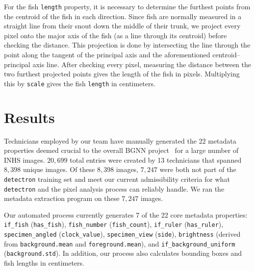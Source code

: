 \documentclass[screen,review]{acmart}
\begin{document}
For the fish \verb|length| property, it is necessary to determine the furthest points from the centroid of the fish in each direction. Since fish are normally measured in a straight line from their snout down the middle of their trunk, we project every pixel onto the major axis of the fish (as a line through its centroid) before checking the distance. This projection is done by intersecting the line through the point along the tangent of the principal axis and the aforementioned centroid--principal axis line. After checking every pixel, measuring the distance between the two furthest projected points gives the length of the fish in pixels. Multiplying this by \verb|scale| gives the fish \verb|length| in centimeters.

\section{Results}
Technicians employed by our team have manually generated the 22 metadata properties deemed crucial to the overall BGNN project~\cite{Leipzig2021.01.28.428644} for a large number of INHS images. \(20,699\) total entries were created by 13 technicians that spanned \(8,398\) unique images. Of these \(8,398\) images, \(7,247\) were both not part of the \verb|detectron| training set and meet our current admissibility criteria for what \verb|detectron| and the pixel analysis process can reliably handle. We ran the metadata extraction program on these \(7,247\) images.

Our automated process currently generates 7 of the 22 core metadata properties: \verb|if_fish| (\verb|has_fish|), \verb|fish_number| (\verb|fish_count|), \verb|if_ruler| (\verb|has_ruler|), \verb|specimen_angled| (\verb|clock_value|), \verb|specimen_view| (\verb|side|), \verb|brightness| (derived from \verb|background.mean| and \verb|foreground.mean|), and \verb|if_background_uniform| (\verb|background.std|). In addition, our process also calculates bounding boxes and fish lengths in centimeters.
\end{document}
